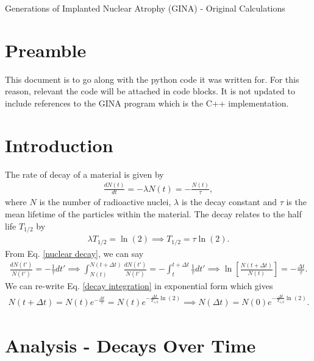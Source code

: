 \documentclass[11pt]{article}
\begin{document}
 

\begin{center}
	{\Large Generations of Implanted Nuclear Atrophy (GINA) - Original Calculations}
\end{center}

\section{Preamble}

This document is to go along with the python code it was written for. For this reason, relevant the code will be attached in code blocks. It is not updated to include references to the GINA program which is the C++ implementation.

\section{Introduction}

The rate of decay of a material is given by
\begin{align}
\frac{dN(t)}{dt} = -\lambda N(t) = -\frac{N(t)}{\tau}, \label{nuclear decay}
\end{align}
where $N$ is the number of radioactive nuclei, $\lambda$ is the decay constant and $\tau$ is the mean lifetime of the particles within the material. The decay relates to the half life $T_{1/2}$ by
\begin{align}
\lambda T_{1/2} = \ln(2) \implies T_{1/2} = \tau \ln(2).
\end{align} 
From Eq. \ref{nuclear decay}, we can say
\begin{align}
\frac{dN(t')}{N(t')} = -\frac{1}{\tau} dt' \implies \int_{N(t)}^{N(t+\Delta t)} \frac{dN(t')}{N(t')} = -\int_{t}^{t+\Delta t}\frac{1}{\tau} dt' \implies \ln\left[\frac{N(t+\Delta t)}{N(t)}\right] = -\frac{\Delta t}{\tau}. \label{decay integration}
\end{align}
We can re-write Eq. \ref{decay integration} in exponential form which gives
\begin{align}
N(t+\Delta t)= N(t)e^{-\frac{\Delta t}{\tau}}=N(t)e^{-\frac{\Delta t}{T_{1/2}}\ln(2)} \implies N(\Delta t)=N(0)e^{-\frac{\Delta t}{T_{1/2}}\ln(2)}. \label{exponential decay law}
\end{align}


\section{Analysis - Decays Over Time}
\end{document}
